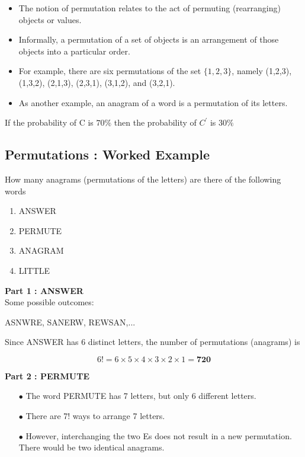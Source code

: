 	\begin{itemize}
		\item The notion of permutation relates to the act of permuting (rearranging) objects or values. 
		\item Informally, a permutation of a set of objects is an arrangement of those objects into a particular order. 
		
		\item For example, there are six permutations of the set $\{1,2,3\}$, namely (1,2,3), (1,3,2), (2,1,3), (2,3,1), (3,1,2), and (3,2,1). 
		\item As another example, an anagram of a word is a permutation of its letters. 
		
	\end{itemize}
	
	If the probability of C is $70 \%$ then the probability of $C^{\prime}$ is $30\%$		
	

\subsection*{Permutations : Worked Example}

How many anagrams (permutations of the letters) are there of the following words

\begin{framed}
\begin{multicols}{2}
\begin{enumerate}
	\item ANSWER
	\item PERMUTE
	\item ANAGRAM
	\item LITTLE
\end{enumerate}
\end{multicols}
\end{framed}


\textbf{Part 1 : ANSWER}\\
Some possible outcomes:
\begin{center}
	ASNWRE,\;
	SANERW,\;
	REWSAN,\;...
\end{center}

Since ANSWER has 6 distinct letters, the number of permutations (anagrams) is

\[6! = 6\times 5 \times 4 \times 3 \times 2\times 1 = \boldsymbol{720} \]

\textbf{Part 2 : PERMUTE}\\
\begin{itemize}
	\item[$\bullet$] The word PERMUTE has 7 letters, but only 6 different letters. 
	\item[$\bullet$] There are 7! ways to arrange 7 letters.
	\item[$\bullet$] However, interchanging the two Es does not result in a new permutation. There would be two identical anagrams.
\end{itemize}


